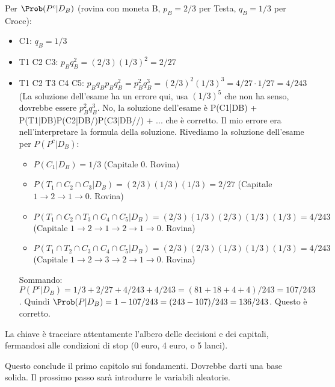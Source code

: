 \begin{example}
Per $\Prob(P^c|D_B)$ (rovina con moneta B, $p_B=2/3$ per Testa, $q_B=1/3$ per Croce):
\begin{itemize}
    \item C1: $q_B = 1/3$
    \item T1 C2 C3: $p_B q_B^2 = (2/3)(1/3)^2 = 2/27$
    \item T1 C2 T3 C4 C5: $p_B q_B p_B q_B^2 = p_B^2 q_B^3 = (2/3)^2 (1/3)^3 = 4/27 \cdot 1/27 = 4/243$ (La soluzione dell'esame ha un errore qui, usa $(1/3)^5$ che non ha senso, dovrebbe essere $p_B^2 q_B^3$. No, la soluzione dell'esame è P(C1|DB) + P(T1|DB)P(C2|DB/)P(C3|DB//) + ... che è corretto. Il mio errore era nell'interpretare la formula della soluzione.
    Rivediamo la soluzione dell'esame per $P(P^c|D_B)$:
    \begin{itemize}
        \item $P(C_1|D_B) = 1/3$ (Capitale 0. Rovina)
        \item $P(T_1 \cap C_2 \cap C_3 | D_B) = (2/3)(1/3)(1/3) = 2/27$ (Capitale $1 \to 2 \to 1 \to 0$. Rovina)
        \item $P(T_1 \cap C_2 \cap T_3 \cap C_4 \cap C_5 | D_B) = (2/3)(1/3)(2/3)(1/3)(1/3) = 4/243$ (Capitale $1 \to 2 \to 1 \to 2 \to 1 \to 0$. Rovina)
        \item $P(T_1 \cap T_2 \cap C_3 \cap C_4 \cap C_5 | D_B) = (2/3)(2/3)(1/3)(1/3)(1/3) = 4/243$ (Capitale $1 \to 2 \to 3 \to 2 \to 1 \to 0$. Rovina)
    \end{itemize}
    Sommando: $P(P^c|D_B) = 1/3 + 2/27 + 4/243 + 4/243 = (81+18+4+4)/243 = 107/243$.
    Quindi $\Prob(P|D_B) = 1 - 107/243 = (243-107)/243 = 136/243$. Questo è corretto.
\end{itemize}
La chiave è tracciare attentamente l'albero delle decisioni e dei capitali, fermandosi alle condizioni di stop (0 euro, 4 euro, o 5 lanci).
\end{example}

Questo conclude il primo capitolo sui fondamenti. Dovrebbe darti una base solida. Il prossimo passo sarà introdurre le variabili aleatorie.


